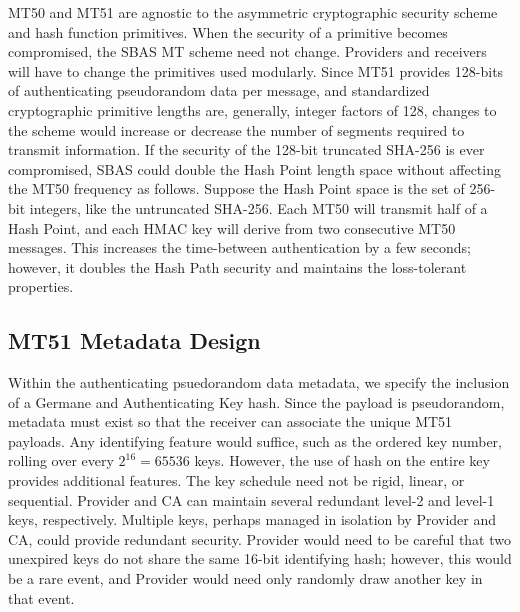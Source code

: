 \documentclass[letterpaper,times]{IONconf/IONconf}
\begin{document}
	MT50 and MT51 are agnostic to the asymmetric cryptographic security scheme and hash function primitives.
	When the security of a primitive becomes compromised, the SBAS MT scheme need not change.
	Providers and receivers will have to change the primitives used modularly.
	Since MT51 provides 128-bits of authenticating pseudorandom data per message, and standardized cryptographic primitive lengths are, generally, integer factors of 128, changes to the scheme would increase or decrease the number of segments required to transmit information.
	If the security of the 128-bit truncated SHA-256 is ever compromised, SBAS could double the Hash Point length space without affecting the MT50 frequency as follows.
	Suppose the Hash Point space is the set of 256-bit integers, like the untruncated SHA-256.
	Each MT50 will transmit half of a Hash Point, and each HMAC key will derive from two consecutive MT50 messages.
	This increases the time-between authentication by a few seconds; however, it doubles the Hash Path security and maintains the loss-tolerant properties.

	\subsection{MT51 Metadata Design} \label{sub:metadata_design}

		Within the authenticating psuedorandom data metadata, we specify the inclusion of a Germane and Authenticating Key hash.
		Since the payload is pseudorandom, metadata must exist so that the receiver can associate the unique MT51 payloads.
		Any identifying feature would suffice, such as the ordered key number, rolling over every $2^{16} = 65536$ keys.
		However, the use of hash on the entire key provides additional features.
		The key schedule need not be rigid, linear, or sequential.
		Provider and CA can maintain several redundant level-2 and level-1 keys, respectively.
		Multiple keys, perhaps managed in isolation by Provider and CA, could provide redundant security.
		Provider would need to be careful that two unexpired keys do not share the same 16-bit identifying hash; however, this would be a rare event, and Provider would need only randomly draw another key in that event.
\end{document}
